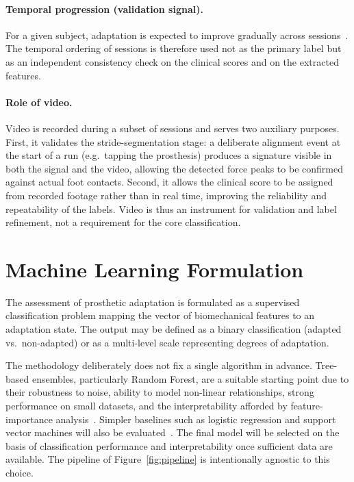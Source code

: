 \paragraph{Temporal progression (validation signal).}
For a given subject, adaptation is expected to improve gradually across
sessions~\cite{Rosen2022,Wendland2019}. The temporal ordering of sessions is
therefore used not as the primary label but as an independent consistency check
on the clinical scores and on the extracted features.

\paragraph{Role of video.}
Video is recorded during a subset of sessions and serves two auxiliary
purposes. First, it validates the stride-segmentation stage: a deliberate
alignment event at the start of a run (e.g.\ tapping the prosthesis) produces a
signature visible in both the signal and the video, allowing the detected
force peaks to be confirmed against actual foot contacts. Second, it allows the
clinical score to be assigned from recorded footage rather than in real time,
improving the reliability and repeatability of the labels. Video is thus an
instrument for validation and label refinement, not a requirement for the core
classification.

\section{Machine Learning Formulation}
\label{section:ml}

The assessment of prosthetic adaptation is formulated as a supervised
classification problem mapping the vector of biomechanical features to an
adaptation state. The output may be defined as a binary classification
(adapted vs.\ non-adapted) or as a multi-level scale representing degrees of
adaptation.

The methodology deliberately does not fix a single algorithm in advance.
Tree-based ensembles, particularly Random Forest, are a suitable starting point
due to their robustness to noise, ability to model non-linear relationships,
strong performance on small datasets, and the interpretability afforded by
feature-importance analysis~\cite{Bulling2014,Wang2019}. Simpler baselines such
as logistic regression and support vector machines will also be
evaluated~\cite{Mannini2016}. The final model will be selected on the basis of
classification performance and interpretability once sufficient data are
available. The pipeline of Figure~\ref{fig:pipeline} is intentionally agnostic
to this choice.

